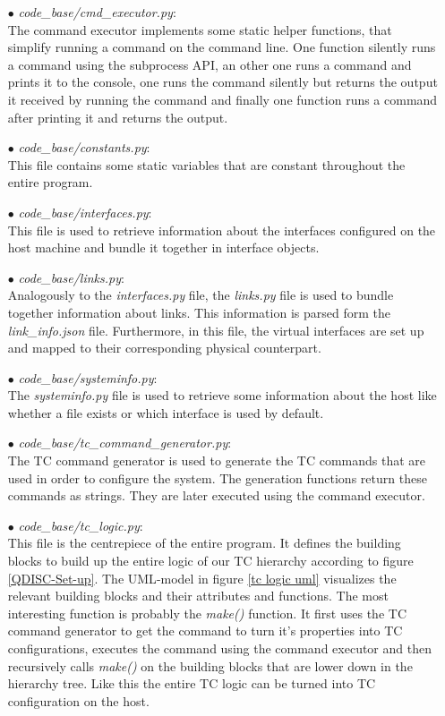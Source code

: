 \begin{enumerate}
\item[$\bullet$]\textit{code\_base/cmd\_executor.py}:
\\
The command executor implements some static helper functions, that simplify running a command on the command line. One function silently runs a command using the subprocess \acs{API}, an other one runs a command and prints it to the console, one runs the command silently but returns the output it received by running the command and finally one function runs a command after printing it and returns the output.

\item[$\bullet$]\textit{code\_base/constants.py}:
\\
This file contains some static variables that are constant throughout the entire program. 

\item[$\bullet$]\textit{code\_base/interfaces.py}:
\\
This file is used to retrieve information about the interfaces configured on the host machine and bundle it together in interface objects.

\item[$\bullet$]\textit{code\_base/links.py}:
\\
Analogously to the \textit{interfaces.py} file, the \textit{links.py} file is used to bundle together information about links. This information is parsed form the \textit{link\_info.json} file. Furthermore, in this file, the virtual interfaces are set up and mapped to their corresponding physical counterpart.

\item[$\bullet$]\textit{code\_base/systeminfo.py}:
\\
The \textit{systeminfo.py} file is used to retrieve some information about the host like whether a file exists or which interface is used by default.

\item[$\bullet$]\textit{code\_base/tc\_command\_generator.py}:
\\
The \acs{TC} command generator is used to generate the \acs{TC} commands that are used in order to configure the system. The generation functions return these commands as strings. They are later executed using the command executor.

\item[$\bullet$]\textit{code\_base/tc\_logic.py}:
\\
This file is the centrepiece of the entire program. It defines the building blocks to build up the entire logic of our \acs{TC} hierarchy according to figure \ref{QDISC-Set-up}. The \ac{UML}-model in figure \ref{tc logic uml} visualizes the relevant building blocks and their attributes and functions. The most interesting function is probably the \textit{make()} function. It first uses the \acs{TC} command generator to get the command to turn it's properties into \acs{TC} configurations, executes the command using the command executor and then recursively calls \textit{make()} on the building blocks that are lower down in the hierarchy tree. Like this the entire \acs{TC} logic can be turned into \acs{TC} configuration on the host. 


\end{enumerate}
